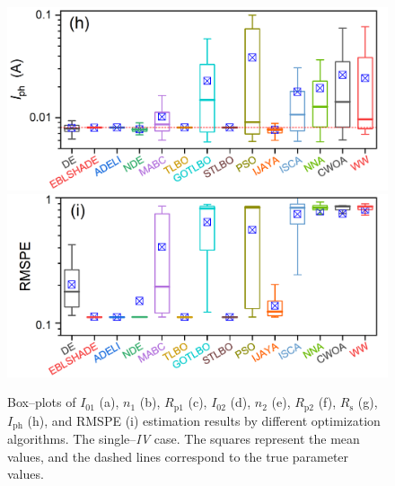 \documentclass[a4paper,fleqn]{cas-sc}
\begin{document}
\begin{figure}[]
        \includegraphics[width=.45\textwidth]{Fig4h}
        \includegraphics[width=.45\textwidth]{Fig4i}
	  \caption{Box--plots of $I_{01}$ (a), $n_1$ (b), $R_\mathrm{p1}$ (c), $I_{02}$ (d),
                   $n_2$ (e), $R_\mathrm{p2}$ (f), $R_\mathrm{s}$ (g), $I_\mathrm{ph}$ (h), and RMSPE (i)
estimation results by different optimization algorithms.
      The single--\emph{IV} case.
      The squares represent the mean values, and the dashed lines correspond to the true parameter values.}\label{figBoxSingleIV}
\end{figure}
\end{document}
